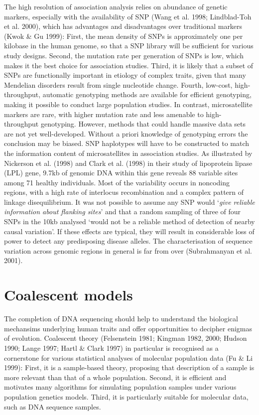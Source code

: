 The high resolution of association analysis relies on abundance of genetic
markers, especially with the availability of SNP (Wang et al.  1998;
Lindblad-Toh et al.  2000), which has advantages and disadvantages over
traditional markers (Kwok \& Gu 1999):  First, the mean density of SNPs is
approximately one per kilobase in the human genome, so that a SNP library will
be sufficient for various study designs.  Second, the mutation rate per
generation of SNPs is low, which makes it the best choice for association
studies.  Third, it is likely that a subset of SNPs are functionally important
in etiology of complex traits, given that many Mendelian disorders result from
single nucleotide change.  Fourth, low-cost, high-throughput, automatic
genotyping methods are available for efficient genotyping, making it possible
to conduct large population studies.  In contrast, microsatellite markers are
rare, with higher mutation rate and less amenable to high-throughput
genotyping.  However, methods that could handle massive data sets are not yet
well-developed.  Without a priori knowledge of genotyping errors the conclusion
may be biased.  SNP haplotypes will have to be constructed to match the
information content of microsatellites in association studies.  As illustrated
by Nickerson et al.  (1998) and Clark et al.  (1998) in their study of
lipoprotein lipase (LPL) gene, 9.7kb of genomic DNA within this gene reveals 88
variable sites among 71 healthy individuals.  Most of the variability occurs in
noncoding regions, with a high rate of interlocus recombination and a complex
pattern of linkage disequilibrium.  It was not possible to assume any SNP would
`{\em give reliable information about flanking sites}' and that a random
sampling of three of four SNPs in the 10kb analysed `would not be a reliable
method of detection of nearby causal variation'.  If these effects are typical,
they will result in considerable loss of power to detect any predisposing
disease alleles.  The characterisation of sequence variation across genomic
regions in general is far from over (Subrahmanyan et al.  2001).


\section{Coalescent models}

The completion of DNA sequencing should help to understand the biological
mechansims underlying human traits and offer opportunities to decipher enigmas
of evolution.  Coalescent theory (Felsenstein 1981; Kingman 1982, 2000; Hudson
1990; Lange 1997; Hartl \& Clark 1997) in particular is recognised as a
cornerstone for various statistical analyses of molecular population data (Fu
\& Li 1999):  First, it is a sample-based theory, proposing that description of
a sample is more relevant than that of a whole population.  Second, it is
efficient and motivates many algorithms for simulating population samples under
various population genetics models.  Third, it is particularly suitable for
molecular data, such as DNA sequence samples.

